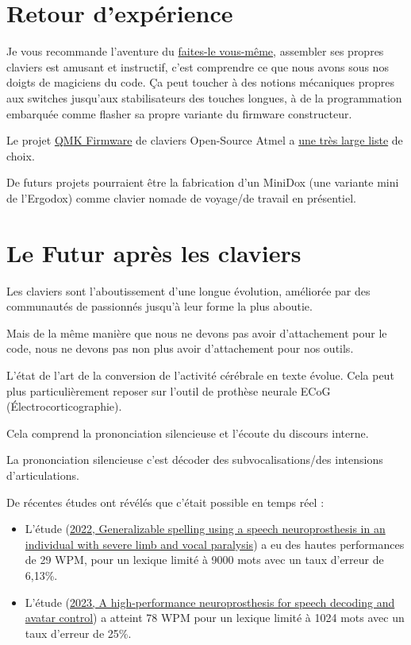 \documentclass[a4paper,11pt]{article}
\begin{document}
\begin{blogmain}

\section{Retour d'expérience}
Je vous recommande l'aventure du \href{https://fr.wikipedia.org/wiki/Do_it_yourself}{faites-le vous-même}, assembler ses propres claviers est amusant et instructif, c'est comprendre ce que nous avons sous nos doigts de magiciens du code. Ça peut toucher à des notions mécaniques propres aux switches jusqu'aux stabilisateurs des touches longues, à de la programmation embarquée comme flasher sa propre variante du firmware constructeur.

Le projet \href{https://qmk.fm}{QMK Firmware} de claviers Open-Source Atmel a \href{https://browse.qmk.fm}{une très large liste} de choix.

De futurs projets pourraient être la fabrication d'un MiniDox (une variante mini de l'Ergodox) comme clavier nomade de voyage/de travail en présentiel.

\section{Le Futur après les claviers}
Les claviers sont l’aboutissement d’une longue évolution, améliorée par des communautés de passionnés jusqu'à leur forme la plus aboutie.

Mais de la même manière que nous ne devons pas avoir d'attachement pour le code, nous ne devons pas non plus avoir d'attachement pour nos outils.

L'état de l'art de la conversion de l'activité cérébrale en texte évolue.
Cela peut plus particulièrement reposer sur l'outil de prothèse neurale ECoG (Électrocorticographie).

Cela comprend la prononciation silencieuse et l'écoute du discours interne.

La prononciation silencieuse c'est décoder des subvocalisations/des intensions d'articulations.

De récentes études ont révélés que c'était possible en temps réel :
\begin{itemize}
  \item L'étude (\href{https://www.nature.com/articles/s41467-022-33611-3}{2022, Generalizable spelling using a speech neuroprosthesis in an individual with severe limb and vocal paralysis}) a eu des hautes performances de 29 WPM, pour un lexique limité à 9000 mots avec un taux d'erreur de 6,13\%.
  \item L'étude (\href{https://www.nature.com/articles/s41586-023-06443-4}{2023, A high-performance neuroprosthesis for speech decoding and avatar control}) a atteint 78 WPM pour un lexique limité à 1024 mots avec un taux d'erreur de 25\%.
\end{itemize}


\end{blogmain}
\end{document}
